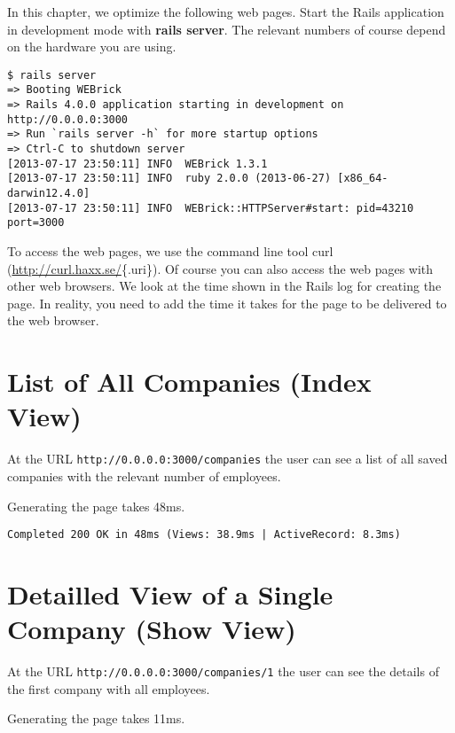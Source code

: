 \documentclass[a4paper]{book}
\begin{document}
In this chapter, we optimize the following web pages. Start the Rails application in development mode with \textbf{rails server}. The relevant numbers of course depend on the hardware you are using.

\begin{shaded}\begin{verbatim}
$ rails server
=> Booting WEBrick
=> Rails 4.0.0 application starting in development on http://0.0.0.0:3000
=> Run `rails server -h` for more startup options
=> Ctrl-C to shutdown server
[2013-07-17 23:50:11] INFO  WEBrick 1.3.1
[2013-07-17 23:50:11] INFO  ruby 2.0.0 (2013-06-27) [x86_64-darwin12.4.0]
[2013-07-17 23:50:11] INFO  WEBrick::HTTPServer#start: pid=43210 port=3000
\end{verbatim}\end{shaded}

To access the web pages, we use the command line tool curl (\url{http://curl.haxx.se/}\{.uri\}). Of course you can also access the web pages with other web browsers. We look at the time shown in the Rails log for creating the page. In reality, you need to add the time it takes for the page to be delivered to the web browser.

\section{List of All Companies (Index View)}\label{list-of-all-companies-index-view}

At the URL \texttt{http://0.0.0.0:3000/companies} the user can see a list of all saved companies with the relevant number of employees.

Generating the page takes 48ms.

\begin{shaded}\begin{verbatim}
Completed 200 OK in 48ms (Views: 38.9ms | ActiveRecord: 8.3ms)
\end{verbatim}\end{shaded}

\section{Detailled View of a Single Company (Show View)}\label{detailled-view-of-a-single-company-show-view}

At the URL \texttt{http://0.0.0.0:3000/companies/1} the user can see the details of the first company with all employees.

Generating the page takes 11ms.
\end{document}
